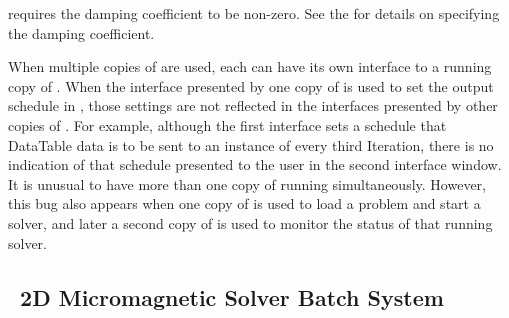  requires the damping coefficient to be non-zero.
See the  for details on specifying the damping
coefficient.

When multiple copies of
are used, each can have its own interface to a running copy of
.  When the interface presented by one copy of
 is used to set the output schedule in ,
those settings are not reflected in the interfaces presented by other
copies of .  For example, although the first interface
sets a schedule that DataTable data is to be sent to an instance of
 every third Iteration, there is
no indication of that schedule presented to the user in the second
interface window.  It is unusual to have more than one copy of
 running simultaneously. However, this bug also appears
when one copy of  is used to load a problem and start a
solver, and later a second copy of  is used to monitor the
status of that running solver.


\subsection{\OOMMF\ 2D Micromagnetic Solver Batch System}\label{sec:obs}


